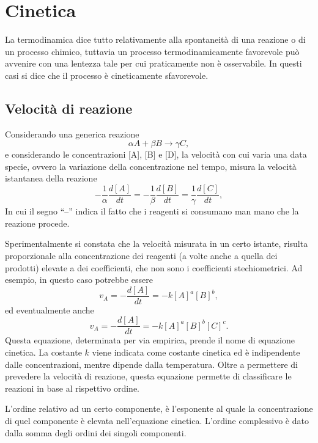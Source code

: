 \chapter{Cinetica}
La termodinamica dice tutto relativamente alla spontaneità di una reazione o di un processo chimico, tuttavia un processo termodinamicamente favorevole può avvenire con una lentezza tale per cui praticamente non è osservabile. In questi casi si dice che il
processo è cineticamente sfavorevole.
\section{Velocità di reazione}
Considerando una generica reazione
\begin{equation}
    \alpha A+\beta B\to\gamma C,
\end{equation}
e considerando le concentrazioni [A], [B] e [D], la velocità con cui varia una data specie, ovvero la variazione della concentrazione nel tempo, misura la velocità istantanea della reazione
\begin{equation}
    -\frac{1}{\alpha}\frac{d[A]}{dt}=-\frac{1}{\beta}\frac{d[B]}{dt}=\frac{1}{\gamma}\frac{d[C]}{dt},
\end{equation}
In cui il segno ``–'' indica il fatto che i reagenti si consumano man mano che la reazione procede.

Sperimentalmente si constata che la velocità misurata in un certo istante, risulta proporzionale alla concentrazione dei reagenti (a volte anche a quella dei prodotti) elevate a dei coefficienti, che non sono i coefficienti stechiometrici. Ad esempio, in questo caso potrebbe essere
\begin{equation}
    v_A=-\frac{d[A]}{dt}=-k[A]^a[B]^b,
\end{equation}
ed eventualmente anche
\begin{equation}
    v_A=-\frac{d[A]}{dt}=-k[A]^a[B]^b[C]^c.
\end{equation}
Questa equazione, determinata per via empirica, prende il nome di equazione cinetica. La costante $k$ viene indicata come costante cinetica ed è indipendente dalle concentrazioni, mentre dipende dalla temperatura. Oltre a permettere di prevedere la velocità di reazione, questa equazione  permette di classificare le reazioni in base al rispettivo ordine.
\begin{defn}
    L'ordine relativo ad un certo componente, è l'esponente al quale la concentrazione di quel componente è elevata nell'equazione cinetica. L'ordine complessivo è dato dalla somma degli ordini dei singoli componenti. 
\end{defn}

